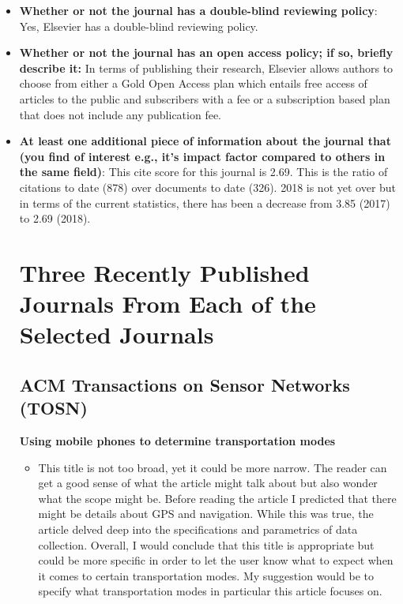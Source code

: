 \documentclass[11pt,twocolumn]{article}
\begin{document}
\begin{itemize}
  \item{\bf{Whether or not the journal has a }}
  {\bf{double-blind reviewing policy}}:
  Yes, Elsevier has a double-blind reviewing policy.
  \item{\bf{Whether or not the journal has an open access policy; if so, briefly describe it:}}
  In terms of publishing their research, Elsevier allows authors to choose from either a Gold Open Access plan which entails free access of articles to the public and subscribers with a fee or a subscription based plan that does not include any publication fee.  
  \item{\bf{At least one additional piece of}}
  {\bf{information about the journal that}}
  {\bf{(you find of interest e.g., it’s impact factor }}
  {\bf{compared to others in the same field)}}:
  This cite score for this journal is 2.69. This is the ratio of citations to date (878) over documents to date (326). 2018 is not yet over but in terms of the current statistics, there has been a decrease from 3.85 (2017) to 2.69 (2018).   
  
 
 \section{Three Recently Published Journals From Each of the Selected Journals}

\subsection{ACM Transactions on Sensor Networks (TOSN)}

{{\bf{Using mobile phones to determine transportation modes}}
\begin{itemize}
\item This title is not too broad, yet it could be more narrow. The reader can get a good sense of what the article might talk about but also wonder what the scope might be. Before reading the article I predicted that there might be details about GPS and navigation. While this was true, the article delved deep into the specifications and parametrics of data collection. Overall, I would conclude that this title is appropriate but could be more specific in order to let the user know what to expect when it comes to certain transportation modes. My suggestion would be to specify what transportation modes in particular this article focuses on.  

\end{itemize}

}
\end{itemize}
\end{document}
